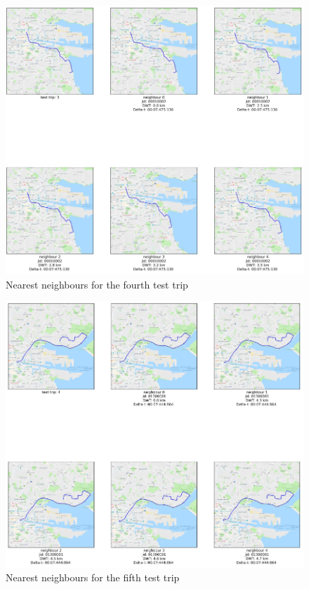 \documentclass[12pt]{article}
\begin{document}
	\begin{figure} [H]
		\begin{center}
			\includegraphics [scale = 0.60] {nn4.png}
			\caption{Nearest neighbours for the fourth test trip}
		\end{center}
	\end{figure} 

	\begin{figure} [H]
		\begin{center}
			\includegraphics [scale = 0.60] {nn5.png}
			\caption{Nearest neighbours for the fifth test trip}
		\end{center}
	\end{figure} 
\end{document}
